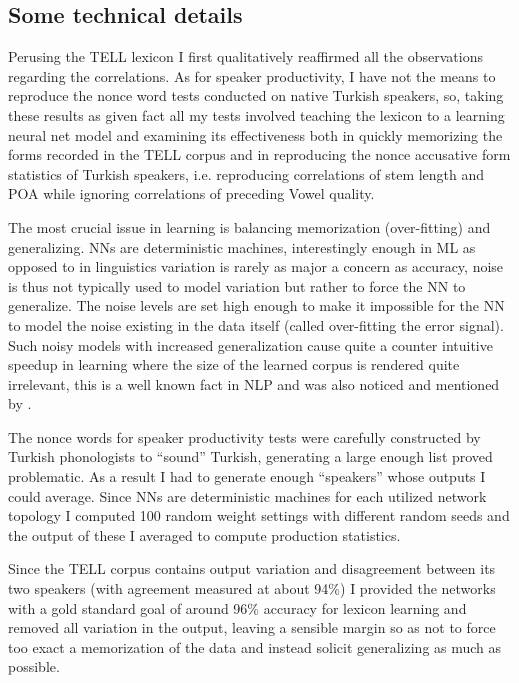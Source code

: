\documentclass[a4paper,12pt]{article}
\begin{document}
\subsection{Some technical details}

Perusing the TELL lexicon I first qualitatively reaffirmed all the observations regarding the
correlations. As for speaker productivity, I have not the means to reproduce the nonce word tests
conducted on native Turkish speakers, so, taking these results as given fact all my tests involved
teaching the lexicon to a learning neural net model and examining its effectiveness both in quickly
memorizing the forms recorded in the TELL corpus and in reproducing the nonce accusative form
statistics of Turkish speakers, i.e. reproducing correlations of stem length and POA while ignoring
correlations of preceding Vowel quality.

The most crucial issue in learning is balancing memorization (over-fitting) and generalizing. NNs
are deterministic machines, interestingly enough in ML as opposed to in linguistics variation
is rarely as major a concern as accuracy, noise is thus not typically used to model variation but
rather to force the NN to generalize. The noise levels are set high enough to make it impossible
for the NN to model the noise existing in the data itself (called over-fitting the error signal).
Such noisy models with increased generalization cause quite a counter intuitive speedup in learning
where the size of the learned corpus is rendered quite irrelevant, this is a well known fact in NLP
and was also noticed and mentioned by \cite{boersma_convergence_2008}.

The nonce words for speaker productivity tests were carefully constructed by Turkish phonologists to
``sound'' Turkish, generating a large enough list proved problematic. As a result I had to generate
enough ``speakers'' whose outputs I could average. Since NNs are deterministic machines for
each utilized network topology I computed 100 random weight settings with different random seeds and
the output of these I averaged to compute production statistics.

Since the TELL corpus contains output variation and disagreement between its two speakers (with
agreement measured at about 94\%) I provided the networks with a gold standard goal of around 96\%
accuracy for lexicon learning and removed all variation in the output, leaving a sensible margin so
as not to force too exact a memorization of the data and instead solicit generalizing as much as
possible.
\end{document}
